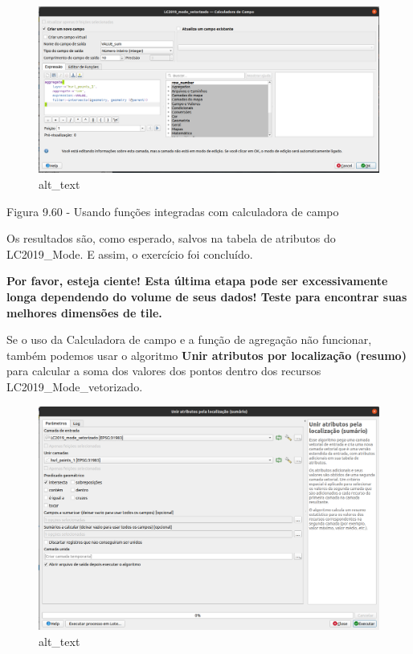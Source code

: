 \documentclass[
]{book}
\begin{document}
\begin{figure}
\centering
\includegraphics{media/modulo9/fig960.png}
\caption{alt\_text}
\end{figure}

Figura 9.60 - Usando funções integradas com calculadora de campo

Os resultados são, como esperado, salvos na tabela de atributos do LC2019\_Mode. E assim, o exercício foi concluído.

\textbf{Por favor, esteja ciente! Esta última etapa pode ser excessivamente longa dependendo do volume de seus dados! Teste para encontrar suas melhores dimensões de tile.}

Se o uso da Calculadora de campo e a função de agregação não funcionar, também podemos usar o algoritmo \textbf{Unir atributos por localização (resumo)} para calcular a soma dos valores dos pontos dentro dos recursos LC2019\_Mode\_vetorizado.

\begin{figure}
\centering
\includegraphics{media/modulo9/fig961.png}
\caption{alt\_text}
\end{figure}
\end{document}
